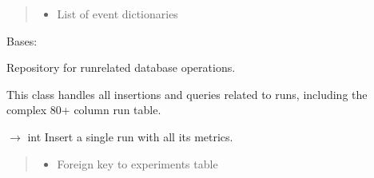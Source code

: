 \documentclass[letterpaper,10pt,english]{sphinxmanual}
\begin{document}
\begin{fulllineitems}
\begin{fulllineitems}
\begin{quote}
\begin{description}
\begin{itemize}
\item {} 
\sphinxAtStartPar
{} \textendash{} List of event dictionaries

\end{itemize}

\end{description}\end{quote}

\end{fulllineitems}


\end{fulllineitems}


\begin{fulllineitems}
\label{\detokenize{core.database.repositories:core.database.repositories.RunsRepository}}
\pysigstartsignatures
\pysiglinewithargsret
{}
{}
{}
\pysigstopsignatures
\sphinxAtStartPar
Bases: 

\sphinxAtStartPar
Repository for run\sphinxhyphen{}related database operations.

\sphinxAtStartPar
This class handles all insertions and queries related to runs,
including the complex 80+ column run table.

\begin{fulllineitems}
\label{\detokenize{core.database.repositories:core.database.repositories.RunsRepository.insert_run}}
\pysigstartsignatures
\pysiglinewithargsret
{}
{\sphinxparamcomma {}\sphinxparamcomma {}}
{{ $\rightarrow$ int}}
\pysigstopsignatures
\sphinxAtStartPar
Insert a single run with all its metrics.
\begin{quote}\begin{description}
\begin{itemize}
\item {} 
\sphinxAtStartPar
{} \textendash{} Foreign key to experiments table


\end{itemize}
\end{description}
\end{quote}
\end{fulllineitems}
\end{fulllineitems}
\end{document}
